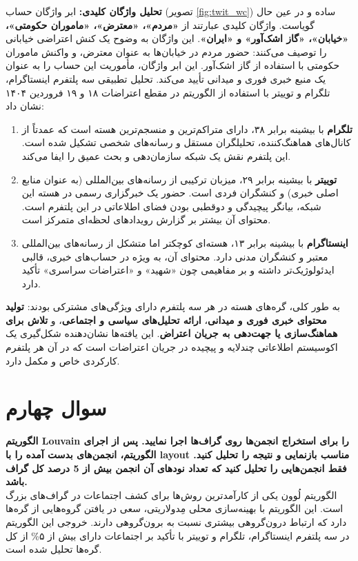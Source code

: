 \documentclass{article}
\begin{document}
	
	\textbf{تحلیل واژگان کلیدی:}
	ابر واژگان حساب  (تصویر \ref{fig:twit_wc}) ساده و در عین حال گویاست. واژگان کلیدی عبارتند از \textbf{«مردم»، «معترض»، «ماموران حکومتی»، «خیابان»، «گاز اشک‌آور» و «ایران»}. این واژگان به وضوح یک کنش اعتراضی خیابانی را توصیف می‌کنند: حضور مردم در خیابان‌ها به عنوان معترض، و واکنش ماموران حکومتی با استفاده از گاز اشک‌آور. این ابر واژگان، مأموریت این حساب را به عنوان یک منبع خبری فوری و میدانی تأیید می‌کند.
	تحلیل تطبیقی سه پلتفرم اینستاگرام، تلگرام و توییتر با استفاده از الگوریتم  در مقطع اعتراضات ۱۸ و ۱۹ فروردین ۱۴۰۴ نشان داد:
	\begin{enumerate}
		\item \textbf{تلگرام} با بیشینه  برابر ۳۸، دارای متراکم‌ترین و منسجم‌ترین هسته است که عمدتاً از کانال‌های هماهنگ‌کننده، تحلیلگران مستقل و رسانه‌های شخصی تشکیل شده است. این پلتفرم نقش یک شبکه سازمان‌دهی و بحث عمیق را ایفا می‌کند.
		\item \textbf{توییتر} با بیشینه  برابر ۲۹، میزبان ترکیبی از رسانه‌های بین‌المللی (به عنوان منابع اصلی خبری) و کنشگران فردی است. حضور یک خبرگزاری رسمی در هسته این شبکه، بیانگر پیچیدگی و دوقطبی بودن فضای اطلاعاتی در این پلتفرم است. محتوای آن بیشتر بر گزارش رویدادهای لحظه‌ای متمرکز است.
		\item \textbf{اینستاگرام} با بیشینه  برابر ۱۳، هسته‌ای کوچکتر اما متشکل از رسانه‌های بین‌المللی معتبر و کنشگران مدنی دارد. محتوای آن، به ویژه در حساب‌های خبری، قالبی ایدئولوژیک‌تر داشته و بر مفاهیمی چون «شهید» و «اعتراضات سراسری» تأکید دارد.
	\end{enumerate}
	به طور کلی، گره‌های هسته در هر سه پلتفرم دارای ویژگی‌های مشترکی بودند: \textbf{تولید محتوای خبری فوری و میدانی}، \textbf{ارائه تحلیل‌های سیاسی و اجتماعی}، و \textbf{تلاش برای هماهنگ‌سازی یا جهت‌دهی به جریان اعتراض}. این یافته‌ها نشان‌دهنده شکل‌گیری یک اکوسیستم اطلاعاتی چندلایه و پیچیده در جریان اعتراضات است که در آن هر پلتفرم کارکردی خاص و مکمل دارد.

\FloatBarrier
\section{سوال چهارم}
\textbf{
الگوریتم Louvain را برای استخراج انجمن‌ها روی گراف‌ها اجرا نمایید. پس از اجرای الگوریتم، انجمن‌های بدست آمده را با layout مناسب بازنمایی و نتیجه را تحلیل کنید.
فقط انجمن‌هایی را تحلیل کنید که تعداد نودهای آن انجمن بیش از 5 درصد کل گراف باشد.}
\\
	الگوریتم لُوون یکی از کارآمدترین روش‌ها برای کشف اجتماعات در گراف‌های بزرگ است. این الگوریتم با بهینه‌سازی محلی مِدولاریتی، سعی در یافتن گروه‌هایی از گره‌ها دارد که ارتباط درون‌گروهی بیشتری نسبت به برون‌گروهی دارند. خروجی این الگوریتم در سه پلتفرم اینستاگرام، تلگرام و توییتر با تأکید بر اجتماعات دارای بیش از ۵\% از کل گره‌ها تحلیل شده است.
	
\end{document}
